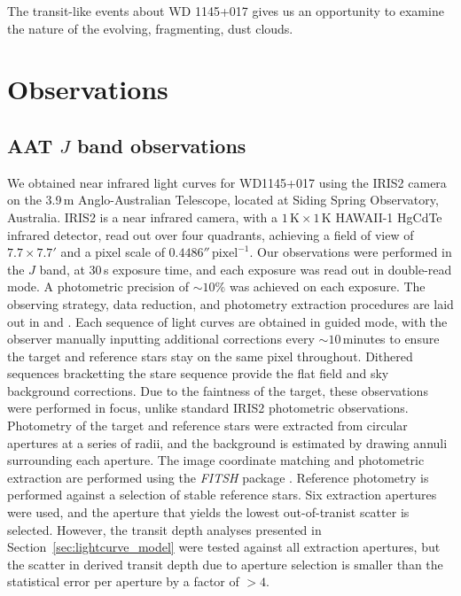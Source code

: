 \documentclass[iop,useAMES,usenatbig]{emulateapj}
\begin{document}
The transit-like events about WD 1145+017 gives us an opportunity to examine the nature of the evolving, fragmenting, dust clouds. 



\section{Observations}
\label{sec:observations}

\subsection{AAT $J$ band observations}
\label{sec:obs_aat}

We obtained near infrared light curves for WD1145+017 using the IRIS2 camera on the 3.9\,m Anglo-Australian Telescope, located at Siding Spring Observatory, Australia. IRIS2 is a near infrared camera, with a $1\,\mathrm{K} \times 1\,\mathrm{K}$ HAWAII-1 HgCdTe infrared detector, read out over four quadrants, achieving a field of view of $7.7 \times 7.7 '$ and a pixel scale of $0.4486''\,\mathrm{pixel}^{-1}$. Our observations were performed in the $J$ band, at 30\,s exposure time, and each exposure was read out in double-read mode. A photometric precision of $\sim 10\mathrm{\%}$ was achieved on each exposure. The observing strategy, data reduction, and photometry extraction procedures are laid out in \citet{2014MNRAS.445.2746Z} and \citet{2015MNRAS.454.3002Z}. Each sequence of light curves are obtained in guided mode, with the observer manually inputting additional corrections every $\sim 10$\,minutes to ensure the target and reference stars stay on the same pixel throughout. Dithered sequences bracketting the stare sequence provide the flat field and sky background corrections. Due to the faintness of the target, these observations were performed in focus, unlike standard IRIS2 photometric observations. Photometry of the target and reference stars were extracted from circular apertures at a series of radii, and the background is estimated by drawing annuli surrounding each aperture. The image coordinate matching and photometric extraction are performed using the \emph{FITSH} package \citep{2012MNRAS.421.1825P}. Reference photometry is performed against a selection of stable reference stars. Six extraction apertures were used, and the aperture that yields the lowest out-of-tranist scatter is selected. However, the transit depth analyses presented in Section~\ref{sec:lightcurve_model} were tested against all extraction apertures, but the scatter in derived transit depth due to aperture selection is smaller than the statistical error per aperture by a factor of $>4$. 
\end{document}
